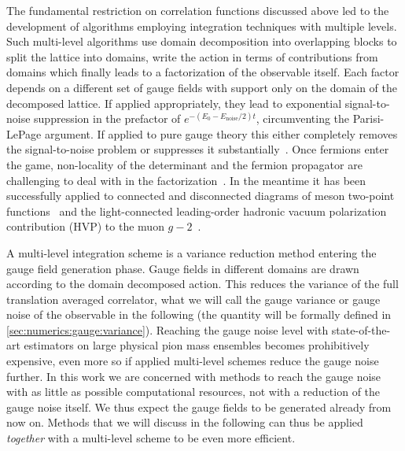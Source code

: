 The fundamental restriction on correlation functions discussed above led to the development of algorithms employing integration techniques with multiple levels.
Such multi-level algorithms use domain decomposition into overlapping blocks to split the lattice into domains, write the action in terms of contributions from domains which finally leads to a factorization of the observable itself.
Each factor depends on a different set of gauge fields with support only on the domain of the decomposed lattice.
If applied appropriately, they lead to exponential signal-to-noise suppression in the prefactor of $e^{-(E_0 - E_{\text{noise}}/2)t}$, circumventing the Parisi-LePage argument.
If applied to pure gauge theory this either completely removes the signal-to-noise problem or suppresses it substantially~\cite{Luscher:2001up,Meyer:2002cd,DellaMorte:2007zz,DellaMorte:2008jd,della2011novel}.
Once fermions enter the game, non-locality of the determinant and the fermion propagator are challenging to deal with in the factorization~\cite{Ce:2016idq,Ce:2016ajy,Giusti:2017ksp,Ce:2017ndt}.
In the meantime it has been successfully applied to connected and disconnected diagrams of meson two-point functions~\cite{Giusti:2018vxm} and the light-connected leading-order hadronic vacuum polarization contribution (HVP) to the muon $g-2$~\cite{DallaBrida:2020cik,Giusti:2021qhk}.

A multi-level integration scheme is a variance reduction method entering the gauge field generation phase.
Gauge fields in different domains are drawn according to the domain decomposed action.
This reduces the variance of the full translation averaged correlator, \ie what we will call the gauge variance or gauge noise of the observable in the following (the quantity will be formally defined in \cref{sec:numerics:gauge:variance}).
Reaching the gauge noise level with state-of-the-art estimators on large physical pion mass ensembles becomes prohibitively expensive, even more so if applied multi-level schemes reduce the gauge noise further.
In this work we are concerned with methods to reach the gauge noise with as little as possible computational resources, not with a reduction of the gauge noise itself.
We thus expect the gauge fields to be generated already from now on.
Methods that we will discuss in the following can thus be applied \emph{together} with a multi-level scheme to be even more efficient. 

